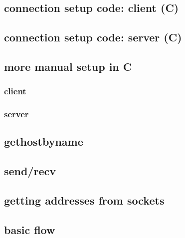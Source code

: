 \subsection{connection setup code: client (C)}
 

\subsection{connection setup code: server (C)}
 

\subsection{more manual setup in C}
\subsubsection{client}
 
\subsubsection{server}
 

\subsection{gethostbyname}
 

\subsection{send/recv}


\subsection{getting addresses from sockets}


\subsection{basic flow}

